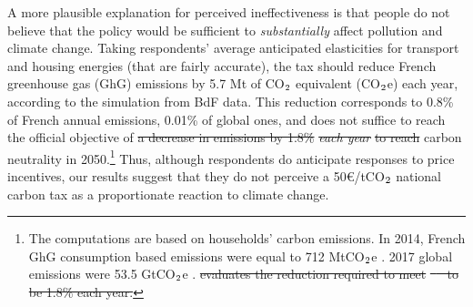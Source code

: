 \documentclass[12pt]{article} %
\providecommand{\DIFdeltex}[1]{{\protect\color{red}\sout{#1}}}                      %
\providecommand{\DIFdelbegin}{} %
\providecommand{\DIFdelend}{} %
\providecommand{\DIFdel}[1]{\texorpdfstring{\DIFdeltex{#1}}{}} %
\newcommand{\DIFscaledelfig}{0.5}
\newlength{\DIFdelgraphicswidth} %
\newlength{\DIFdelgraphicsheight} %
\newcommand{\DIFdelincludegraphics}[2][]{%
\sbox{\DIFdelgraphicsbox}{\DIFOincludegraphics[#1]{#2}}%
\settoboxwidth{\DIFdelgraphicswidth}{\DIFdelgraphicsbox} %
\settoboxtotalheight{\DIFdelgraphicsheight}{\DIFdelgraphicsbox} %
\scalebox{\DIFscaledelfig}{%
\parbox[b]{\DIFdelgraphicswidth}{\usebox{\DIFdelgraphicsbox}\\[-\baselineskip] \rule{\DIFdelgraphicswidth}{0em}}\llap{\resizebox{\DIFdelgraphicswidth}{\DIFdelgraphicsheight}{%
\setlength{\unitlength}{\DIFdelgraphicswidth}%
\begin{picture}(1,1)%
\thicklines\linethickness{2pt} %
{\color[rgb]{1,0,0}\put(0,0){\framebox(1,1){}}}%
{\color[rgb]{1,0,0}\put(0,0){\line( 1,1){1}}}%
{\color[rgb]{1,0,0}\put(0,1){\line(1,-1){1}}}%
\end{picture}%
}\hspace*{3pt}}} %
} %
\DeclareRobustCommand{\DIFdelbegin}{\DIFOdelbegin \let\includegraphics\DIFdelincludegraphics} %
\DeclareRobustCommand{\DIFdelend}{\DIFOaddend \let\includegraphics\DIFOincludegraphics} %
\begin{document}
A more plausible explanation for perceived ineffectiveness is that people do not believe that the policy would be sufficient to \textit{substantially} affect pollution and climate change. Taking respondents' average anticipated elasticities for transport and housing energies (that are fairly accurate), the tax should reduce French greenhouse gas (GhG) emissions by 5.7 Mt of CO$_\textnormal{2}$ equivalent (CO$_\textnormal{2}$e) each year, according to the simulation from BdF data. This reduction corresponds to 0.8\% of French annual emissions, 0.01\% of global ones, and does not suffice to reach the official objective of \DIFdelbegin \DIFdel{a decrease in emissions by 1.8\% }\textit{\DIFdel{each year}} %
\DIFdel{to reach }\DIFdelend carbon neutrality in 2050.\footnote{The computations are based on households' carbon emissions. In 2014, French GhG consumption based emissions were equal to 712 MtCO$_\textnormal{2}$e \citep{cgdd_chiffres_2019}. 2017 global emissions were 53.5 GtCO$_\textnormal{2}$e \citep{unep_emissions_2018}.\DIFdelbegin %
\DIFdel{evaluates the reduction required to meet }%
\DIFdel{\mbox{%
\citep{ministry_of_ecology_france_2015} }\hspace{0pt}%
to be 1.8\% each year.}\DIFdelend } Thus, although respondents do anticipate responses to price incentives, our results suggest that they do not perceive a 50\euro/tCO$_\textnormal{2}$ national carbon tax as a proportionate reaction to climate change. 

\end{document}
